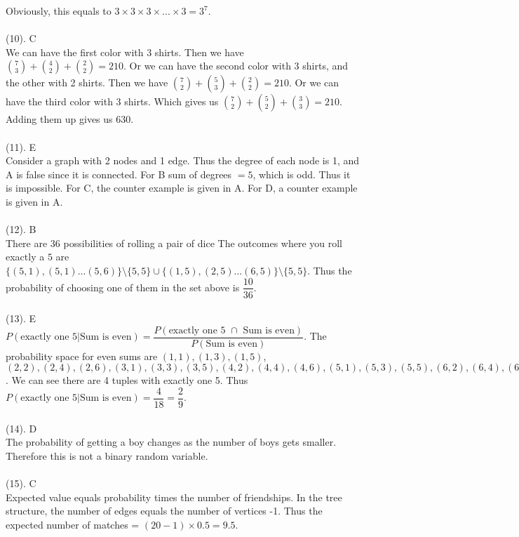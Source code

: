 \documentclass{article}
\begin{document}
	Obviously, this equals to $3 \times 3 \times 3 \times ... \times 3 = 3^7$.\\\\
	(10). C\\
	We can have the first color with 3 shirts. Then we have $\binom{7}{3} + \binom{4}{2} + \binom{2}{2} = 210$. Or we can have the second color with 3 shirts, and the other with 2 shirts. Then we have $\binom{7}{2} + \binom{5}{3} + \binom{2}{2} = 210$. Or we can have the third color with 3 shirts. Which gives us $\binom{7}{2} + \binom{5}{2} + \binom{3}{3} = 210$. Adding them up gives us 630.
	\\\\
	(11). E\\
	Consider a graph with 2 nodes and 1 edge. Thus the degree of each node is 1, and A is false since it is connected. For B sum of degrees $= 5$, which is odd. Thus it is impossible. For C, the counter example is given in A. For D, a counter example is given in A.\\\\
	(12). B\\
	There are 36 possibilities of rolling a pair of dice The outcomes where you roll exactly a $5$ are $\{(5,1),(5,1)...(5,6)\}\setminus\{5,5\} \cup \{(1,5),(2,5)...(6,5)\}\setminus\{5,5\}$. Thus the probability of choosing one of them in the set above is $\dfrac{10}{36}$.\\\\
	(13). E\\
	$P(\text{exactly one 5|Sum is even}) = \dfrac{P(\text{exactly one 5 $\cap$ Sum is even})}{P(\text{Sum is even})}$. The probability space for even sums are $(1,1),(1,3),(1,5)$,\\$(2,2),(2,4),(2,6),(3,1),(3,3),(3,5),(4,2),(4,4),(4,6),(5,1),(5,3),(5,5),(6,2),(6,4),(6,6)$. We can see there are 4 tuples with exactly one 5. Thus $P(\text{exactly one 5|Sum is even})=\dfrac{4}{18} = \dfrac{2}{9}$.\\\\
	(14). D\\
	The probability of getting a boy changes as the number of boys gets smaller. Therefore this is not a binary random variable.\\\\
	(15). C\\
	Expected value equals probability times the number of friendships. In the tree structure, the number of edges equals the number of vertices -1. Thus the expected number of matches = $(20-1) \times 0.5 = 9.5$.\\\\
\end{document}
